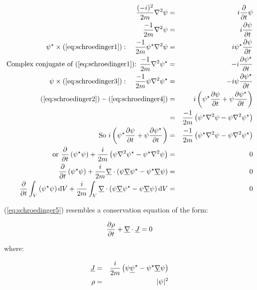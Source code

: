 \begin{eqnarray}
  \frac{(-i)^2}{2m}\nabla^2 \psi & = & i \frac{\partial}{\partial t}\psi \nonumber \\
  \frac{-1}{2m}\nabla^2\psi & = & i\frac{\partial \psi}{\partial t} \label{eq:schroedinger1} \\
  \psi^{\star} \times (\ref{eq:schroedinger1}) :\quad \frac{-1}{2m} \psi^{\star}\nabla^2\psi & = & i\psi^{\star}\frac{\partial \psi}{\partial t} \label{eq:schroedinger2} \\
  \textrm{Complex conjugate of (\ref{eq:schroedinger1}): } \frac{-1}{2m}\nabla^2\psi^{\star} & = & -i\frac{\partial \psi^{\star}}{\partial t} \label{eq:schroedinger3} \\
  \psi \times (\ref{eq:schroedinger3}) :\quad \frac{-1}{2m}\psi\nabla^2\psi^{\star} & = & -i\psi\frac{\partial \psi^{\star}}{\partial t} \label{eq:schroedinger4} \\
  (\ref{eq:schroedinger2}) - (\ref{eq:schroedinger4}) & = & i\left( \psi^{\star}\frac{\partial \psi}{\partial t} + \psi\frac{\partial \psi^{\star}}{\partial t} \right) \nonumber \\
  & = & \frac{-1}{2m}\left(\psi^{\star}\nabla^2\psi - \psi\nabla^2\psi^{\star}\right) \nonumber \\
  \textrm{So } i\left(\psi^{\star}\frac{\partial \psi}{\partial t} + \psi\frac{\partial \psi^{\star}}{\partial t}\right) & = & \frac{-1}{2m}\left(\psi^{\star}\nabla^2\psi - \psi\nabla^2\psi^{\star}\right) \nonumber \\
  \textrm{or } \frac{\partial}{\partial t}\left(\psi^{\star}\psi\right) + \frac{i}{2m}\left(\psi\nabla^2\psi^{\star} - \psi^{\star}\nabla^2\psi \right) & = & 0 \nonumber \\
  \frac{\partial}{\partial t}\left(\psi^{\star}\psi\right) + \frac{i}{2m}\underline{\nabla}\cdot\left(\psi\underline{\nabla}\psi^{\star} - \psi^{\star}\underline{\nabla}\psi\right) & = & 0 \nonumber \\
  \frac{\partial}{\partial t}\int_V\left(\psi^{\star}\psi\right) \mathrm{d}V + \frac{i}{2m}\int_V \underline{\nabla}\cdot\left(\psi\underline{\nabla}\psi^{\star}-\psi\underline{\nabla}\psi\right) \mathrm{d}V & = & 0 \label{eq:schroedinger5}
\end{eqnarray}

(\ref{eq:schroedinger5}) resembles a conservation equation of the form:

\[
  \frac{\partial \rho}{\partial t} + \underline{\nabla}\cdot\underline{J} = 0
\]

where:

\begin{eqnarray*}
  \underline{J} & = & \frac{i}{2m}\left(\psi\underline{\psi}^{\star} - \psi^{\star}\underline{\nabla}\psi\right) \\
  \rho & = & |\psi|^2
\end{eqnarray*}

